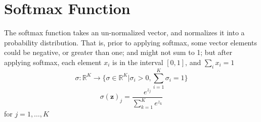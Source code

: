 \documentclass[11pt]{article}
\newcommand{\tb}[1]{\textbf{#1}}
\newcommand{\real}[0]{\mathbb{R}}
\newcommand{\vz}[0]{\tb{z}}
\begin{document}
	\section{Softmax Function}
	The softmax function takes an un-normalized vector, and normalizes it into a probability distribution. That is, prior to applying softmax, some vector elements could be negative, or greater than one; and might not sum to 1; but after applying softmax, each element $x_i$ is in the interval $[0,1]$, and $\sum_i x_i = 1$ \\
	$$\sigma:\real^K \rightarrow \{\sigma\in \real^K|\sigma_i>0,\sum_{i=1}^K \sigma_i = 1\}$$
	$$\sigma(\vz)_j = \frac{e^{z_j}}{\sum_{k=1}^K e^{z_k}}$$ for $j = 1,\hdots,K$
\end{document}
